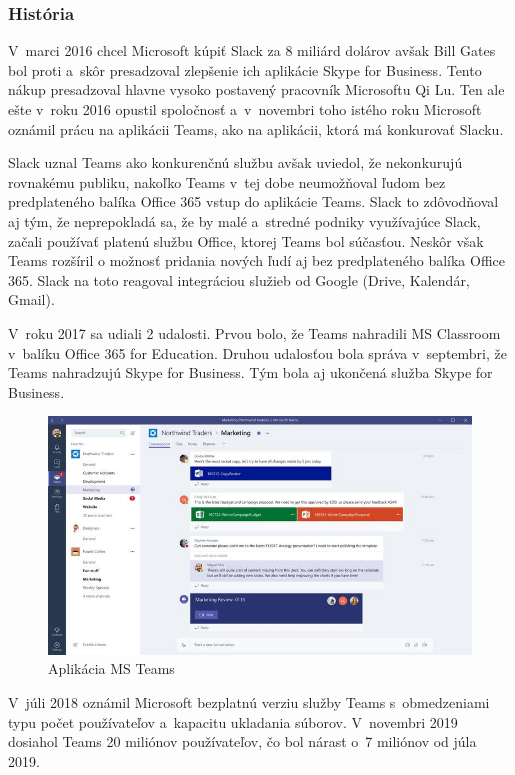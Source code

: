 \subsubsection{História}
\indent V marci 2016 chcel Microsoft kúpiť Slack za 8 miliárd dolárov avšak Bill Gates bol proti a skôr presadzoval zlepšenie ich aplikácie Skype for Business. Tento nákup presadzoval hlavne vysoko postavený pracovník Microsoftu Qi Lu. Ten ale ešte v roku 2016 opustil spoločnosť a v novembri toho istého roku Microsoft oznámil prácu na aplikácii Teams, ako na aplikácii, ktorá má konkurovať Slacku. 

\indent Slack uznal Teams ako konkurenčnú službu avšak uviedol, že nekonkurujú rovnakému publiku, nakoľko Teams v tej dobe neumožňoval ľudom bez predplateného balíka Office 365 vstup do aplikácie Teams. Slack to zdôvodňoval aj tým, že neprepokladá sa, že by malé a stredné podniky využívajúce Slack, začali používať platenú službu Office, ktorej Teams bol súčasťou. Neskôr však Teams rozšíril o možnosť pridania nových ľudí aj bez predplateného balíka Office 365. Slack na toto reagoval integráciou služieb od Google (Drive, Kalendár, Gmail). 

\indent V roku 2017 sa udiali 2 udalosti. Prvou bolo, že Teams nahradili MS Classroom v balíku Office 365 for Education. Druhou udalosťou bola správa v septembri, že Teams nahradzujú Skype for Business. Tým bola aj ukončená služba Skype for Business. 

\begin{figure}[H]
    \centering
    \includegraphics[scale=0.70]{img/obr-ms-teams.jpg}
    \caption{Aplikácia MS Teams}
    \label{fig:img-ms-teams}
\end{figure}

\indent V júli 2018 oznámil Microsoft bezplatnú verziu služby Teams s obmedzeniami typu počet používateľov a kapacitu ukladania súborov. V novembri 2019 dosiahol Teams 20 miliónov používateľov, čo bol nárast o 7 miliónov od júla 2019. 
